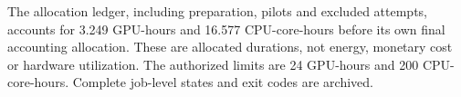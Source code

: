 The allocation ledger, including preparation, pilots and excluded attempts, accounts for 3.249 GPU-hours and 16.577 CPU-core-hours before its own final accounting allocation. These are allocated durations, not energy, monetary cost or hardware utilization. The authorized limits are 24 GPU-hours and 200 CPU-core-hours. Complete job-level states and exit codes are archived.
